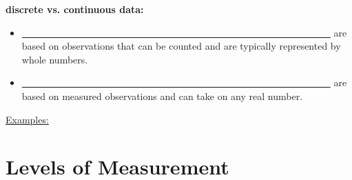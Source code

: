\documentclass[12pt, letterpaper]{article}
\theoremstyle{definition}
\begin{document}
\begin{defn}
\textbf{discrete vs. continuous data:}
\vspace*{.3in}

\begin{itemize}
\item \underline{~~~~~~~~~~~~~~~~~~~~~~~~~~~~~~~~~~~~~~~~~~~~~~~~~~~~~~~~~~~~~~~~} are based on observations that can be counted and are typically represented by whole numbers.
\vspace*{.3in}

\item \underline{~~~~~~~~~~~~~~~~~~~~~~~~~~~~~~~~~~~~~~~~~~~~~~~~~~~~~~~~~~~~~~~~} are based on measured observations and can take on any real number.
\vspace*{.3in}
\end{itemize}

\end{defn}


\vspace*{.2in}

\underline{Examples:}

\vfill

\newpage

\section*{Levels of Measurement}
\end{document}
